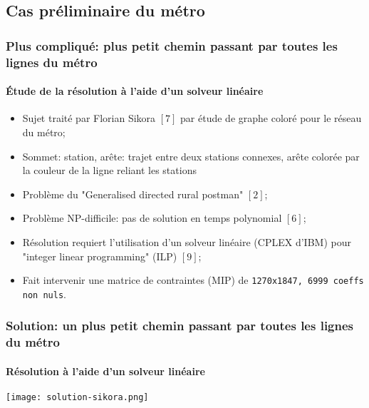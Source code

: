 \documentclass[10pt]{beamer}
\begin{document}
\subsection{Cas préliminaire du métro}

\begin{frame}
\frametitle{Plus compliqué: plus petit chemin passant par toutes les lignes du métro}
\framesubtitle{Étude de la résolution à l'aide d'un solveur linéaire}
\begin{itemize}
\item Sujet traité par Florian Sikora $[7]$ par étude de graphe coloré pour le réseau du métro;
\item Sommet: station, arête: trajet entre deux stations connexes, arête colorée par la couleur de la ligne reliant les stations
\item Problème du "Generalised directed rural postman" $[2]$;
\item Problème NP-difficile: pas de solution en temps polynomial $[6]$;
\item Résolution requiert l'utilisation d’un solveur linéaire (CPLEX d'IBM) pour "integer linear programming" (ILP) $[9]$;
\item Fait intervenir une matrice de contraintes (MIP) de \texttt{1270x1847, 6999 coeffs non nuls}.
\end{itemize}
\end{frame}

\begin{frame}
\frametitle{Solution: un plus petit chemin passant par toutes les lignes du métro}
\framesubtitle{Résolution à l'aide d'un solveur linéaire}
\begin{center}
\texttt{[image: solution-sikora.png]}
\end{center}
\end{frame}
\end{document}
